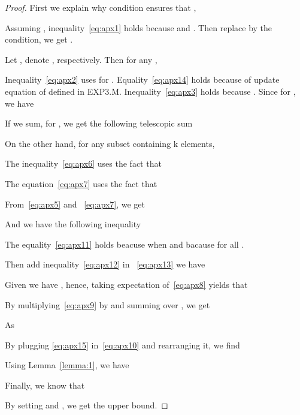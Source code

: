 \documentclass{article}
\begin{document}
\begin{proof}
First we explain why condition  ensures that ,
{\footnotesize

}
Assuming , inequality~\eqref{eq:apx1} holds because  and . Then replace  by the condition, we get .

Let ,  denote ,  respectively. Then for any ,
{\footnotesize

}

Inequality~\eqref{eq:apx2} uses  for . Equality~\eqref{eq:apx14} holds because of update equation of  defined in EXP3.M. Inequality~\eqref{eq:apx3} holds because . Since  for , we have
{\footnotesize

}

If we sum, for , we get the following telescopic sum
{\footnotesize

}

On the other hand, for any subset  containing k elements,
{\footnotesize

}
The inequality~\eqref{eq:apx6} uses the fact that
{\footnotesize

}

The equation~\eqref{eq:apx7} uses the fact that
{\footnotesize

}

From~\eqref{eq:apx5} and ~\eqref{eq:apx7}, we get
{\footnotesize

}

And we have the following inequality
{\footnotesize

}
The equality~\eqref{eq:apx11} holds beacuse  when  and  bacause  for all .

Then add inequality~\eqref{eq:apx12} in ~\eqref{eq:apx13} we have
{\footnotesize

}
Given  we have , hence, taking expectation of~\eqref{eq:apx8} yields that
{\footnotesize

}
By multiplying~\eqref{eq:apx9} by  and summing over , we get
{\footnotesize

}
As
{\footnotesize

}

By plugging \eqref{eq:apx15} in~\eqref{eq:apx10} and rearranging it, we find
{\footnotesize

}
Using Lemma~\ref{lemma:1}, we have
{\footnotesize

}
Finally, we know that 
{\footnotesize

}
By setting  and , we get the upper bound.

\end{proof}
\end{document}
